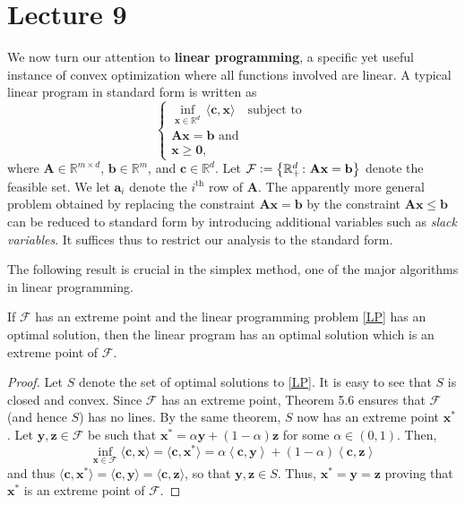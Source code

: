 \section{Lecture 9}

We now turn our attention to \textbf{linear programming}, a specific yet useful instance of convex optimization where all functions involved are linear. A typical linear program in standard form is written as
\begin{equation}
    \label{LP}
    \begin{cases}
        \displaystyle\inf_{\mathbf{x} \in \mathbb{R}^d} \, \langle \mathbf{c}, \mathbf{x} \rangle \quad \text{subject to } \\
        \mathbf{Ax} = \mathbf{b} \text{ and } \\
        \mathbf{x} \geq \mathbf{0},
    \end{cases} \tag{LP}
\end{equation}
where $\mathbf{A} \in \mathbb{R}^{m \times d}$, $\mathbf{b} \in \mathbb{R}^m$, and $\mathbf{c} \in \mathbb{R}^d$. Let $\mathcal{F} \vcentcolon= \left\{ \mathbb{R}^d_+ \colon \mathbf{Ax} = \mathbf{b} \right\}$ denote the feasible set. We let $\mathbf{a}_i$ denote the $i^{\text{th}}$ row of $\mathbf{A}$. The apparently more general problem obtained by replacing the constraint $\mathbf{Ax} = \mathbf{b}$ by the constraint $\mathbf{Ax} \leq \mathbf{b}$ can be reduced to standard form by introducing additional variables such as \textit{slack variables}. It suffices thus to restrict our analysis to the standard form.

The following result is crucial in the simplex method, one of the major algorithms in linear programming. 

\begin{thm}
    If $\mathcal{F}$ has an extreme point and the linear programming problem \eqref{LP} has an optimal solution, then the linear program has an optimal solution which is an extreme point of $\mathcal{F}$.
\end{thm}
\begin{proof}
    Let $S$ denote the set of optimal solutions to \eqref{LP}. It is easy to see that $S$ is closed and convex. Since $\mathcal{F}$ has an extreme point, Theorem 5.6 ensures that $\mathcal{F}$ (and hence $S$) has no lines. By the same theorem, $S$ now has an extreme point $\mathbf{x}^*$. Let $\mathbf{y}, \mathbf{z} \in \mathcal{F}$ be such that $\mathbf{x}^* = \alpha \mathbf{y} + (1-\alpha)\mathbf{z}$ for some $\alpha \in (0,1)$. Then, 
    \[
        \inf_{\mathbf{x} \in \mathcal{F}} \langle \mathbf{c}, \mathbf{x} \rangle = \langle \mathbf{c}, \mathbf{x}^* \rangle = \alpha \left\langle \mathbf{c}, \mathbf{y} \right\rangle + (1-\alpha) \left\langle \mathbf{c}, \mathbf{z} \right\rangle
    \]
    and thus $\langle \mathbf{c}, \mathbf{x}^* \rangle = \langle \mathbf{c}, \mathbf{y} \rangle = \langle \mathbf{c}, \mathbf{z} \rangle$, so that $\mathbf{y}, \mathbf{z} \in S$. Thus, $\mathbf{x}^* = \mathbf{y} = \mathbf{z}$ proving that $\mathbf{x}^*$ is an extreme point of $\mathcal{F}$. 
\end{proof}

